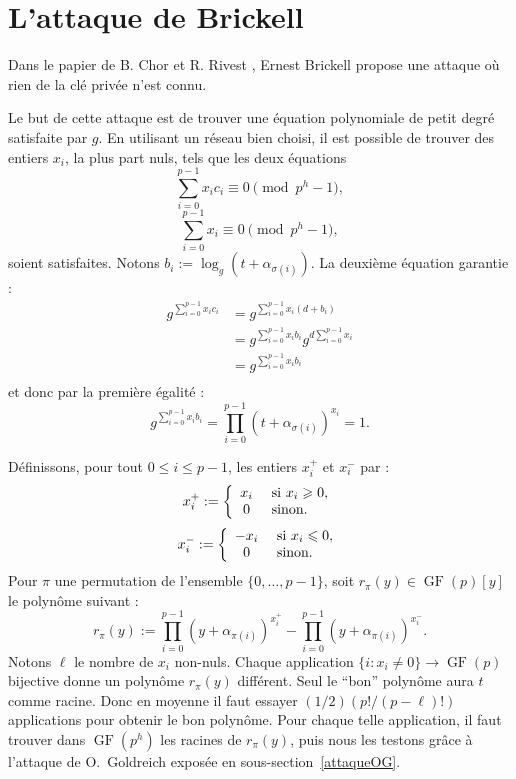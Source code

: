 \documentclass[a4paper, titlepage]{article}
\theoremstyle{definition}
\theoremstyle{remark}
\def\gf{\operatorname{GF}}
\begin{document}
\section{L'attaque de Brickell}

Dans le papier de B. Chor et R. Rivest \cite[Section VII, A.5]{chorRivest1988}, Ernest Brickell propose une attaque où rien de la clé privée n'est connu.

Le but de cette attaque est de trouver une équation polynomiale de petit degré satisfaite par $g$. En utilisant un réseau bien choisi, il est possible de trouver des entiers $x_i$, la plus part nuls, tels que les deux équations
$$\sum_{i=0}^{p-1} x_ic_i \equiv 0 \pmod{p^h-1},$$
$$\sum_{i=0}^{p-1} x_i \equiv 0 \pmod{p^h-1},$$
soient satisfaites. Notons $b_i := \log_{g}(t+\alpha_{\sigma(i)})$. La deuxième équation garantie :
\begin{align*}
g^{\sum_{i=0}^{p-1} x_ic_i} &= g^{\sum_{i=0}^{p-1} x_i(d+b_i)} \\
&= g^{\sum_{i=0}^{p-1} x_ib_i} g^{d\sum_{i=0}^{p-1} x_i} \\
&= g^{\sum_{i=0}^{p-1} x_ib_i} \\
\end{align*}
et donc par la première égalité :
$$g^{\sum_{i=0}^{p-1} x_ib_i} = \prod_{i=0}^{p-1} \left(t + \alpha_{\sigma(i)}\right)^{x_i} = 1.$$ 

Définissons, pour tout $0\leqslant i\leqslant p-1$, les entiers $x_i^+$ et $x_i^-$ par :
$$x_i^+ := \left\{ \begin{array}{c l}
x_i & \text{ si } x_i \geqslant 0,\\
0 & \text{ sinon}.\\
\end{array} \right.$$
$$x_i^- := \left\{ \begin{array}{c l}
-x_i & \text{ si } x_i \leqslant 0,\\
0 & \text{ sinon}.\\
\end{array} \right.$$
Pour $\pi$ une permutation de l'ensemble $\{0, \dots, p-1\}$, soit $r_\pi(y) \in \gf(p)[y]$ le polynôme suivant :
$$r_\pi(y) := \prod_{i=0}^{p-1} (y+\alpha_{\pi(i)})^{x_i^+} - \prod_{i=0}^{p-1} (y+\alpha_{\pi(i)})^{x_i^-}.$$
Notons $\ell$ le nombre de $x_i$ non-nuls. Chaque application $\{ i : x_i \neq 0\} \rightarrow \gf(p)$ bijective donne un polynôme $r_\pi(y)$ différent. Seul le ``bon'' polynôme aura $t$ comme racine. Donc en moyenne il faut essayer $(1/2)(p!/(p-\ell)!)$ applications pour obtenir le bon polynôme. Pour chaque telle application, il faut trouver dans $\gf(p^h)$ les racines de $r_\pi(y)$, puis nous les testons grâce à l'attaque de O.~Goldreich exposée en sous-section~\ref{attaqueOG}.
\end{document}
